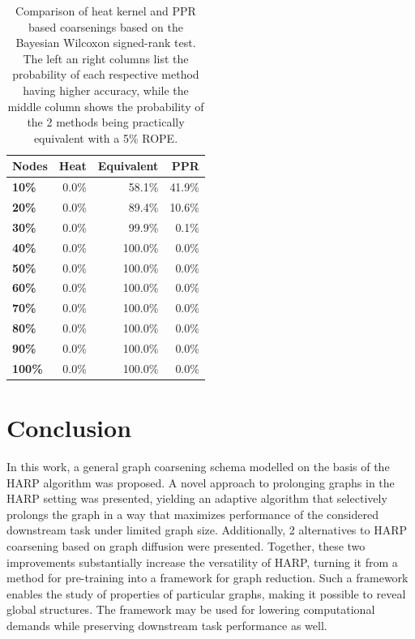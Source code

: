 \documentclass[sn-mathphys,pdflatex,iicol]{sn-jnl}%
\begin{document}
\begin{table}
  \begin{center}
    \begin{minipage}{180pt} %
      \caption{Comparison of heat kernel and PPR based coarsenings based on the Bayesian Wilcoxon signed-rank test. The left an right columns list the probability of each respective method having higher accuracy, while the middle column shows the probability of the 2 methods being practically equivalent with a 5\% ROPE.}
      \label{tab:bayesian-heat-ppr}
      \begin{tabular}{lrrr}
        \toprule
        \textbf{Nodes} & \textbf{Heat} & \textbf{Equivalent} & \textbf{PPR} \\
        \midrule
        \textbf{10\%}  & 0.0\%         & 58.1\%            & 41.9\%         \\
        \textbf{20\%}  & 0.0\%         & 89.4\%            & 10.6\%         \\
        \textbf{30\%}  & 0.0\%         & 99.9\%            & 0.1\%         \\
        \textbf{40\%}  & 0.0\%         & 100.0\%           & 0.0\%          \\
        \textbf{50\%}  & 0.0\%         & 100.0\%           & 0.0\%          \\
        \textbf{60\%}  & 0.0\%         & 100.0\%           & 0.0\%          \\
        \textbf{70\%}  & 0.0\%         & 100.0\%           & 0.0\%          \\
        \textbf{80\%}  & 0.0\%         & 100.0\%           & 0.0\%          \\
        \textbf{90\%}  & 0.0\%         & 100.0\%           & 0.0\%          \\
        \textbf{100\%} & 0.0\%         & 100.0\%           & 0.0\%          \\
        \bottomrule
      \end{tabular}
    \end{minipage}
  \end{center}
\end{table}

\section{Conclusion}

In this work, a general graph coarsening schema modelled on the basis of the HARP algorithm was proposed. A novel approach to prolonging graphs in the HARP setting was presented, yielding an adaptive algorithm that selectively prolongs the graph in a way that maximizes performance of the considered downstream task under limited graph size. Additionally, 2 alternatives to HARP coarsening based on graph diffusion were presented. Together, these two improvements substantially increase the versatility of HARP, turning it from a method for pre-training into a framework for graph reduction. Such a framework enables the study of properties of particular graphs, making it possible to reveal global structures. The framework may be used for lowering computational demands while preserving downstream task performance as well.
\end{document}
